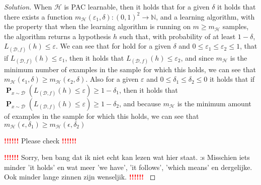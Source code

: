 \documentclass[10pt, a4paper, twoside]{amsart}
\newcommand{\N}{\ensuremath{\mathbb{N}}}
\renewcommand{\P}{\operatorname*{\ensuremath{\mathbf{P}}}} %
\newenvironment{solution}
               {\let\oldqedsymbol=\qedsymbol
                \renewcommand{\qedsymbol}{$\blacktriangleleft$}
                \begin{proof}[Solution]}
               {\end{proof}
                \renewcommand{\qedsymbol}{\oldqedsymbol}}
\newcommand{\TODO}{\textcolor{red}{\textbf{!!!!!! }}}
\begin{document}
\begin{solution}
When $\mathcal{H}$ is PAC learnable, then it holds that for a given $\delta$ it holds that there exists a function $m_{\mathcal{H}}(\varepsilon_1,\delta ):(0,1)^2 \rightarrow \N$, and a learning algorithm, with the property that when the learning algorithm is running on $m \geq m_{\mathcal{H}}$ samples, the algorithm returns a hypothesis $h$ such that, with probability of at least $1- \delta$, $L_{(\mathcal{D},f)}(h)\leq \varepsilon$. We can see that for hold for a given $\delta$ and $0 \leq \varepsilon_1 \leq \varepsilon_2 \leq 1$, that if $L_{(\mathcal{D},f)}(h)\leq \varepsilon_1$, then it holds that $L_{(\mathcal{D},f)}(h)\leq \varepsilon_2$, and since $m_{\mathcal{H}}$ is the minimum number of examples in the sample for which this holds, we can see that $m_{\mathcal{H}}(\epsilon_1, \delta) \geq m_{\mathcal{H}}(\epsilon_2, \delta)$. Also for a given $\varepsilon$ and $0\leq \delta_1 \leq \delta_2 \leq 0$ it holds that if $\P_{x\sim \mathcal{D}}(L_{(\mathcal{D},f)}(h)\leq \varepsilon) \geq 1-\delta_1$, then it holds that $\P_{x\sim \mathcal{D}}(L_{(\mathcal{D},f)}(h)\leq \varepsilon) \geq 1-\delta_2$, and because $m_{\mathcal{H}}$ is the minimum amount of examples in the sample for which this holds, we can see that $m_{\mathcal{H}}(\epsilon, \delta_1) \geq m_{\mathcal{H}}(\epsilon, \delta_2)$

\TODO Please check \TODO

\TODO Sorry, ben bang dat ik niet echt kan lezen wat hier staat. :s Misschien iets minder 'it holds' en wat meer 'we have', 'it follows', 'which means' en dergelijke. Ook minder lange zinnen zijn wenseljik. \TODO
\end{solution}
\end{document}
